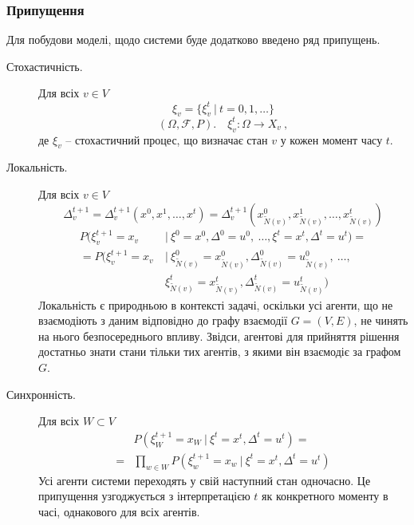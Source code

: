 \documentclass[oneside,14pt]{extarticle}
\begin{document}
\subsubsection{Припущення}

Для побудови моделі, щодо системи буде додатково введено ряд припущень.

\begin{description}

    \item[Стохастичність.] Для всіх \(v \in V\)
    \[ \xi_v = \{\xi^t_v\ |\ t = 0, 1, \ldots \}\] 
    \[ (\Omega, \mathcal{F}, P).\quad \xi_v^t : \Omega \rightarrow X_v\ ,\]
    де \( \xi_v \) – стохастичний процес, що визначає стан \(v\) у кожен момент часу \(t\). 
    \label{stochasticprocess}
    
    \item[Локальність.] Для всіх \(v \in V\) 
    \[\Delta_v^{t+1} = \Delta_v^{t+1}(x^0, x^1, \ldots, x^t) = \Delta_v^{t+1}(x_{\tilde{N}(v)}^0, x_{\tilde{N}(v)}^1, \ldots, x_{\tilde{N}(v)}^t)\]
    \begin{align*}
    P(\xi_v^{t+1} = x_v\ &|\ \xi^0 = x^0, \Delta^0 = u^0,\ \ldots, \xi^t = x^t, \Delta^t = u^t) = \\
	= P(\xi_v^{t+1} = x_v\ &|\ \xi_{\tilde N(v)}^0 = x_{\tilde N(v)}^0, \Delta_{\tilde N(v)}^0 = u_{\tilde N(v)}^0,\ \ldots,\\ &\xi_{\tilde N(v)}^t = x_{\tilde N(v)}^t, \Delta_{\tilde N(v)}^t = u_{\tilde N(v)}^t)
	\end{align*}
	Локальність є природньою в контексті задачі, оскільки усі агенти, що не взаємодіють з даним відповідно до графу взаємодії \(G = (V, E)\), не чинять на нього безпосереднього впливу. Звідси, агентові для прийняття рішення достатньо знати стани тільки тих агентів, з якими він взаємодіє за графом \(G\).
	
    \item[Синхронність.] Для всіх \(W \subset V\)
    \begin{align*}
    &P(\xi^{t+1}_W = x_W\ |\ \xi^t = x^t, \Delta^t = u^t) = \\
    = &\prod_{w \in W} P(\xi^{t+1}_w = x_w\ |\ \xi^t = x^t, \Delta^t = u^t)
    \end{align*}
    Усі агенти системи переходять у свій наступний стан одночасно. Це припущення узгоджується з інтерпретацією \(t\) як конкретного моменту в часі, однакового для всіх агентів.


\end{description}
\end{document}
